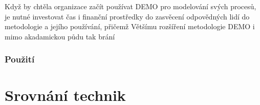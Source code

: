 \documentclass[]{article}
\begin{document}
Když by chtěla organizace začít používat DEMO pro modelování svých procesů, je nutné investovat čas i finanční prostředky do zasvěcení odpovědných lidí do metodologie a jejího používání, přičemž Většímu rozšíření metodologie DEMO i mimo akadamickou půdu tak brání

\subsubsection{Použití}


\section{Srovnání technik}

\nocite{*}


\end{document}
